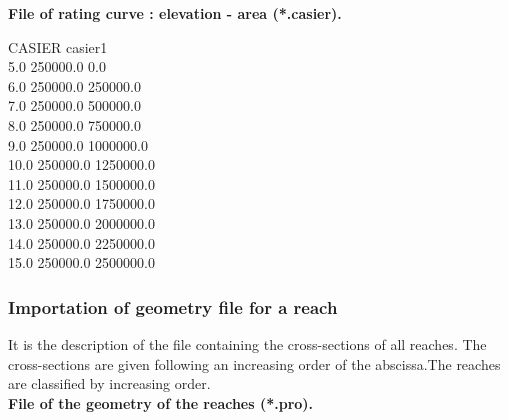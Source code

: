 \documentclass[a4paper,12pt]{article}
\begin{document}
\vspace{0.5cm}

\textbf{File of rating curve : elevation - area  (*.casier).}

CASIER casier1\\
5.0 250000.0 0.0\\
6.0 250000.0 250000.0\\
7.0 250000.0 500000.0\\
8.0 250000.0 750000.0\\
9.0 250000.0 1000000.0\\
10.0 250000.0 1250000.0\\
11.0 250000.0 1500000.0\\
12.0 250000.0 1750000.0\\
13.0 250000.0 2000000.0\\
14.0 250000.0 2250000.0\\
15.0 250000.0 2500000.0\\



\subsubsection{Importation of geometry file for a reach}

It is the description of the file containing the cross-sections of all reaches.  The cross-sections are given following an increasing order of the abscissa.The reaches are classified by increasing order.\\
\vspace{0.5cm}
\textbf{File of the geometry of the reaches (*.pro).}
\end{document}

